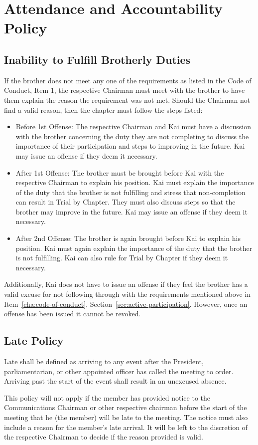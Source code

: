 \chapter{Attendance and Accountability Policy}
\label{cha:attendance-and-accountability-policy}

\section{Inability to Fulfill Brotherly Duties}
\label{sec:inability-to-fulfill-brotherly-duties}

If the brother does not meet any one of the requirements as listed in the Code
of Conduct, Item 1, the respective Chairman must meet with the brother to have
them explain the reason the requirement was not met.
Should the Chairman not find a valid reason, then the chapter must follow the
steps listed:

\begin{itemize}
	\item Before 1st Offense: The respective Chairman and Kai must have a
		discussion with the brother concerning the duty they are not completing
		to discuss the importance of their participation and steps to improving
		in the future.
		Kai may issue an offense if they deem it necessary.
	\item After 1st Offense: The brother must be brought before Kai with the
		respective Chairman to explain his position.
		Kai must explain the importance of the duty that the brother is not
		fulfilling and stress that non-completion can result in Trial by
		Chapter.
		They must also discuss steps so that the brother may improve in the
		future.
		Kai may issue an offense if they deem it necessary.
	\item After 2nd Offense: The brother is again brought before Kai to explain
		his position.
		Kai must again explain the importance of the duty that the brother is
		not fulfilling.
		Kai can also rule for Trial by Chapter if they deem it necessary.
\end{itemize}

Additionally, Kai does not have to issue an offense if they feel the brother has
a valid excuse for not following through with the requirements mentioned above
in Item~\ref{cha:code-of-conduct}, Section~\ref{sec:active-participation}.
However, once an offense has been issued it cannot be revoked.

\section{Late Policy}

Late shall be defined as arriving to any event after the President,
parliamentarian, or other appointed officer has called the meeting to order.
Arriving past the start of the event shall result in an unexcused absence.

This policy will not apply if the member has provided notice to the
Communications Chairman or other respective chairman before the start of the
meeting that he (the member) will be late to the meeting.
The notice must also include a reason for the member's late arrival.
It will be left to the discretion of the respective Chairman to decide if the
reason provided is valid.

